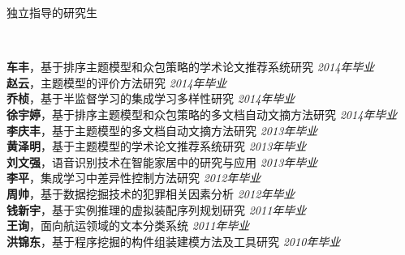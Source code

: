 \documentclass[9pt]{article}
\newenvironment{changemargin}[2]{%
  \begin{list}{}{%
    \setlength{\topsep}{0pt}%
    \setlength{\leftmargin}{#1}%
    \setlength{\rightmargin}{#2}%
    \setlength{\listparindent}{\parindent}%
    \setlength{\itemindent}{\parindent}%
    \setlength{\parsep}{\parskip}%
  }%
  \item[]}{\end{list}
}
\newcommand{\lineover}{
	\begin{changemargin}{-0.05in}{-0.05in}
		\vspace*{-8pt}
		\hrulefill \\
		\vspace*{-2pt}
	\end{changemargin}
}
\newcommand{\header}[1]{
	\begin{changemargin}{-0.5in}{-0.5in}
		\scshape{#1}\\
  	\lineover
	\end{changemargin}
}
\newenvironment{body} {
	\vspace*{-16pt}
	\begin{changemargin}{-0.25in}{-0.5in}
  }
	{\end{changemargin}
}
\begin{document}
\smallskip
\medskip



\header{\Large{独立指导的研究生}}

\begin{body}
	\vspace{14pt}
	\textbf{车丰}，基于排序主题模型和众包策略的学术论文推荐系统研究 \hfill{} \emph{2014年毕业}\\
	\smallskip
	\textbf{赵云}，主题模型的评价方法研究 \hfill{} \emph{2014年毕业}\\
	\smallskip
	\textbf{乔桢}，基于半监督学习的集成学习多样性研究 \hfill{} \emph{2014年毕业}\\
	\smallskip
	\textbf{徐宇婷}，基于排序主题模型和众包策略的多文档自动文摘方法研究 \hfill{} \emph{2014年毕业}\\
	\smallskip
	\textbf{李庆丰}，基于主题模型的多文档自动文摘方法研究 \hfill{} \emph{2013年毕业}\\
	\smallskip
	\textbf{黄泽明}，基于主题模型的学术论文推荐系统研究 \hfill{} \emph{2013年毕业}\\
	\smallskip
	\textbf{刘文强}，语音识别技术在智能家居中的研究与应用 \hfill{} \emph{2013年毕业}\\
	\smallskip
	\textbf{李平}，集成学习中差异性控制方法研究 \hfill{} \emph{2012年毕业}\\
	\smallskip
	\textbf{周帅}，基于数据挖掘技术的犯罪相关因素分析 \hfill{} \emph{2012年毕业}\\
	\smallskip
	\textbf{钱新宇}，基于实例推理的虚拟装配序列规划研究 \hfill{} \emph{2011年毕业}\\
	\smallskip
	\textbf{王询}，面向航运领域的文本分类系统 \hfill{} \emph{2011年毕业}\\
	\smallskip
	\textbf{洪锦东}，基于程序挖掘的构件组装建模方法及工具研究 \hfill{} \emph{2010年毕业}\\
	\smallskip
\end{body}
\end{document}
